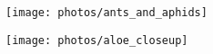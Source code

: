 \documentclass[a4paper,landscape]{memoir}
\begin{document}
\texttt{[image: photos/ants\_and\_aphids]}

\clearpage

\texttt{[image: photos/aloe\_closeup]}
\end{document}
